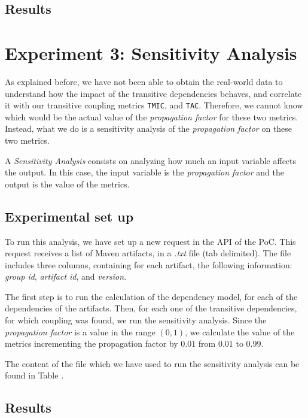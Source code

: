
\subsection{Results}

\section{Experiment 3: Sensitivity Analysis}
As explained before, we have not been able to obtain the real-world data to understand how the impact of the transitive dependencies behaves, and correlate it with our transitive coupling metrics \texttt{TMIC}, and \texttt{TAC}. Therefore, we cannot know which would be the actual value of the \textit{propagation factor} for these two metrics. Instead, what we do is a sensitivity analysis of the \textit{propagation factor} on these two metrics.

A \textit{Sensitivity Analysis} consists on analyzing how much an input variable affects the output. In this case, the input variable is the \textit{propagation factor} and the output is the value of the metrics.

\subsection{Experimental set up}

To run this analysis, we have set up a new request in the API of the PoC. This request receives a list of Maven artifacts, in a \textit{.txt} file (tab delimited). The file includes three columns, containing for each artifact, the following information: \textit{group id}, \textit{artifact id}, and \textit{version}.

The first step is to run the calculation of the dependency model, for each of the dependencies of the artifacts. Then, for each one of the transitive dependencies, for which coupling was found, we run the sensitivity analysis. Since the \textit{propagation factor} is a value in the range $(0,1)$, we calculate the value of the metrics incrementing the propagation factor by $0.01$ from $0.01$ to $0.99$.

The content of the file which we have used to run the sensitivity analysis can be found in Table .

\subsection{Results}

